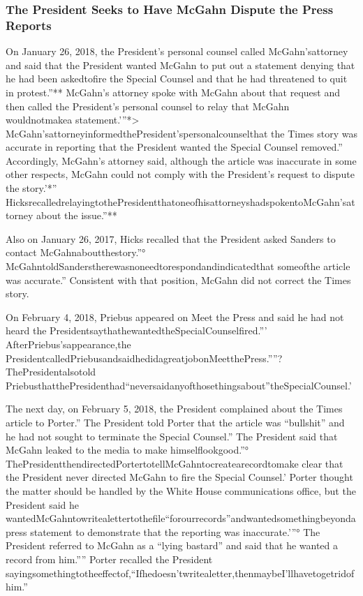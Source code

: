 \subsubsection{The President Seeks to Have McGahn Dispute the Press Reports}

On January 26, 2018, the President's personal counsel called McGahn'sattorney and said that the President wanted McGahn to put out a statement denying that he had been askedtofire the Special Counsel and that he had threatened to quit in protest.”** McGahn's attorney spoke with McGahn about that request and then called the President's personal counsel to relay that McGahn wouldnotmakea statement.'”*> McGahn'sattorneyinformedthePresident'spersonalcounselthat the Times story was accurate in reporting that the President wanted the Special Counsel removed.” Accordingly, McGahn's attorney said, although the article was inaccurate in some other respects, McGahn could not comply with the President's request to dispute the story.'*” HicksrecalledrelayingtothePresidentthatoneofhisattorneyshadspokentoMcGahn'sattorney about the issue.”**

Also on January 26, 2017, Hicks recalled that the President asked Sanders to contact McGahnaboutthestory.”° McGahntoldSanderstherewasnoneedtorespondandindicatedthat someofthe article was accurate.” Consistent with that position, McGahn did not correct the Times story.

On February 4, 2018, Priebus appeared on Meet the Press and said he had not heard the PresidentsaythathewantedtheSpecialCounselfired.”' AfterPriebus'sappearance,the PresidentcalledPriebusandsaidhedidagreatjobonMeetthePress.””? ThePresidentalsotold PriebusthatthePresidenthad“neversaidanyofthosethingsabout”theSpecialCounsel.'

The next day, on February 5, 2018, the President complained about the Times article to Porter.” The President told Porter that the article was “bullshit” and he had not sought to terminate the Special Counsel.” The President said that McGahn leaked to the media to make himselflookgood.”° ThePresidentthendirectedPortertotellMcGahntocreatearecordtomake clear that the President never directed McGahn to fire the Special Counsel.' Porter thought the matter should be handled by the White House communications office, but the President said he wantedMcGahntowritealettertothefile“forourrecords”andwantedsomethingbeyondapress statement to demonstrate that the reporting was inaccurate.'”° The President referred to McGahn as a “lying bastard” and said that he wanted a record from him.”” Porter recalled the President sayingsomethingtotheeffectof,“Ifhedoesn'twritealetter,thenmaybeI'llhavetogetridof him.”

